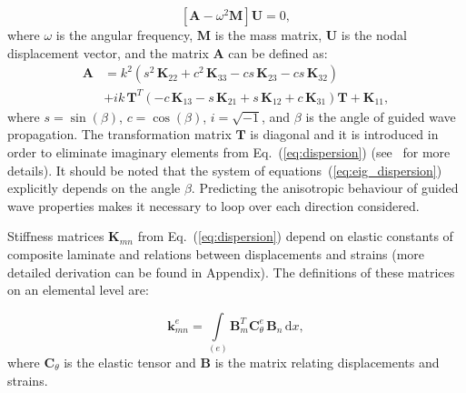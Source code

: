 \documentclass[preprint,12pt]{elsarticle}
\newcommand{\matr}[1]{\mathbf{#1}} %
\newcommand{\vect}[1]{\mathbf{#1}} %
\newcommand{\ud}{\mathrm{d}}
\begin{document}
	\begin{equation}
	\left[\matr{A} - \omega^2\matr{M} \right] \vect{U} =0,
	\label{eq:eig_dispersion}
	\end{equation}
	where \(\omega\) is the angular frequency, \(\matr{M}\) is the mass matrix, 
	\(\matr{U}\) 
	is the nodal displacement vector, and the matrix \(\matr{A}\) can be defined as:
	\begin{equation}
	\begin{aligned}
	\matr{A} & =  k^2\left(s^2 \,\matr{K}_{22} + c^2\, \matr{K}_{33} - c s\, \matr{K}_{23} - 
	c s\, 
\matr{K}_{32}\right) \\
	& + i k\, \matr{T}^T\left(-c\, \matr{K}_{13} - s\, \matr{K}_{21} + s\, \matr{K}_{12} + c\, 
	\matr{K}_{31}\right) 
\matr{T} +\matr{K}_{11},
	\end{aligned}
	\label{eq:dispersion}
	\end{equation}
	where  \(s = \sin(\beta)\), \(c = \cos(\beta)\), \(i = \sqrt{-1}\), and \(\beta\) is the angle 
	of 
	guided wave propagation. The transformation matrix \(\matr{T}\) is diagonal and it is 
	introduced in order to eliminate imaginary elements from Eq.~(\ref{eq:dispersion}) 
	(see~\cite{Bartoli2006} for more details). It should be noted that the system of 
	equations~(\ref{eq:eig_dispersion}) explicitly depends on the angle \(\beta\). 
	Predicting the anisotropic behaviour of guided wave properties makes it necessary to 
	loop over each direction considered.
	
	Stiffness matrices \(\matr{K}_{mn}\) from Eq.~(\ref{eq:dispersion}) depend on elastic 
	constants of composite laminate and relations between displacements and strains 
	(more detailed derivation can be found in Appendix). The definitions of these matrices 
	on an elemental level are:
	
	\begin{equation}
	\matr{k}_{mn}^e= \int \limits_{(e)} \matr{B}_m^{T} \matr{C}_{\theta}^e \, \matr{B}_n\, 
	\ud x, 
	\label{eq:stiffness_matrix_e}
	\end{equation}
	where \(\matr{C}_{\theta}\) is the elastic tensor and \(\matr{B}\) is the matrix relating 
	displacements and strains.
	
\end{document}

